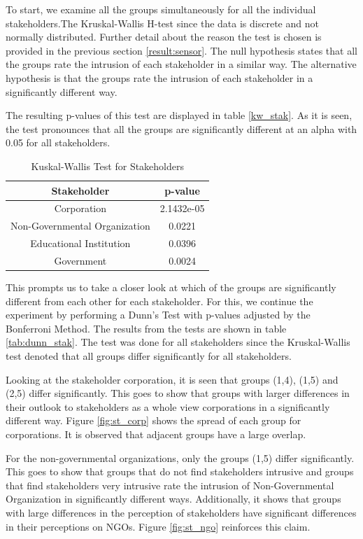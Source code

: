 To start, we examine all the groups simultaneously for all the individual stakeholders.The Kruskal-Wallis H-test since the data is discrete and not normally distributed. Further detail about the reason the test is chosen is provided in the previous section \ref{result:sensor}. The null hypothesis states that all the groups rate the intrusion of each stakeholder in a similar way. The alternative hypothesis is that the groups rate the intrusion of each stakeholder in a significantly different way.

The resulting p-values of this test are displayed in table \ref{kw_stak}. As it is seen, the test pronounces that all the groups are significantly different at an alpha with 0.05 for all stakeholders. 


\begin{table}[h!]
  \centering
  \caption{Kuskal-Wallis Test for Stakeholders}
  \label{tab:kw_stak}
  \begin{tabular}{cc}
    \toprule
     Stakeholder & p-value \\
    \midrule
    Corporation & 2.1432e-05 \\
    Non-Governmental Organization & 0.0221\\
    Educational Institution & 0.0396\\
    Government & 0.0024\\ 
    \bottomrule
  \end{tabular}
\end{table}

This prompts us to take a closer look at which of the groups are significantly different from each other for each stakeholder. For this, we continue the experiment by performing a Dunn's Test with p-values adjusted by the Bonferroni Method. The results from the tests are shown in table \ref{tab:dunn_stak}. The test was done for all stakeholders since the Kruskal-Wallis test denoted that all groups differ significantly for all stakeholders. 

Looking at the stakeholder corporation, it is seen that groups (1,4), (1,5) and (2,5) differ significantly. This goes to show that groups with larger differences in their outlook to stakeholders as a whole view corporations in a significantly different way. Figure \ref{fig:st_corp} shows the spread of each group for corporations. It is observed that adjacent groups have a large overlap.

For the non-governmental organizations, only the groups (1,5) differ significantly. This goes to show that groups that do not find stakeholders intrusive and groups that find stakeholders very intrusive rate the intrusion of Non-Governmental Organization in significantly different ways. Additionally, it shows that groups with large differences in the perception of stakeholders have significant differences in their perceptions on NGOs. Figure \ref{fig:st_ngo} reinforces this claim.

